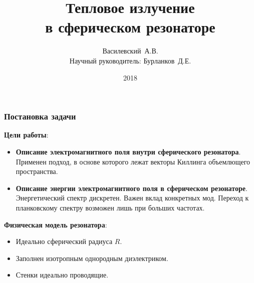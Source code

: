 \documentclass[compress]{beamer}
\title{Тепловое излучение\\ в сферическом резонаторе}
\author[Василевский~А.В.]{
    Василевский~А.В. \\[\baselineskip]
    {\footnotesize Научный руководитель: Бурланков~Д.Е.}
}
\institute[ННГУ]{Нижегородский университет им. Н.И.~Лобачевского}
\date{2018}
\begin{document}

    \frame[plain]{\titlepage}


    \begin{frame}\frametitle{Постановка задачи}

        \textbf{Цели работы}:
        \begin{itemize}\justifying
            \item \textbf{Описание электромагнитного поля внутри сферического резонатора}.
                Применен подход, в основе которого лежат векторы Киллинга объемлющего пространства.
            \item \textbf{Описание энергии электромагнитного поля в сферическом резонаторе}.
                Энергетический спектр дискретен. Важен вклад конкретных мод. Переход к планковскому спектру возможен лишь при больших частотах.
        \end{itemize}

        \textbf{Физическая модель резонатора}:
        \begin{itemize}\justifying
            \item Идеально сферический радиуса $R$.
            \item Заполнен изотропным однородным диэлектриком.
            \item Стенки идеально проводящие.
        \end{itemize}

    \end{frame}

\end{document}
